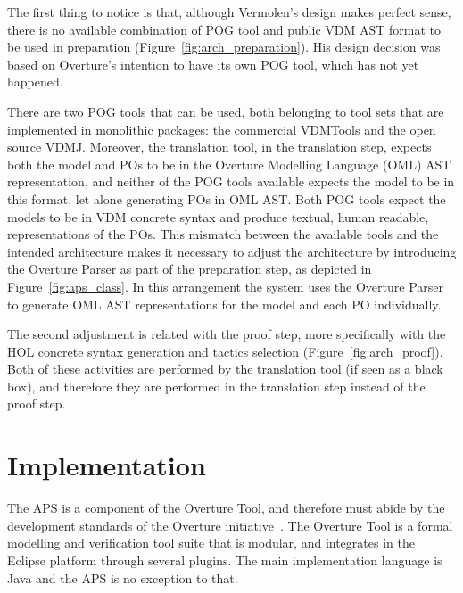 \documentclass[]{article}
\begin{document}
The first thing to notice is that, although Vermolen's design makes perfect sense, there is no available combination of POG tool and public VDM AST format to be used in preparation (Figure~\ref{fig:arch_preparation}).
His design decision was based on Overture's intention to have its own POG tool, which has not yet happened.

There are two POG tools that can be used, both belonging to tool sets that are implemented in monolithic packages: the commercial VDMTools and the open source VDMJ.
Moreover, the translation tool, in the translation step, expects both the model and POs to be in the Overture Modelling Language (OML) AST representation, and neither of the POG tools available expects the model to be in this format, let alone generating POs in OML AST.
Both POG tools expect the models to be in VDM concrete syntax and produce textual, human readable, representations of the POs.
This mismatch between the available tools and the intended architecture makes it necessary to adjust the architecture by introducing the Overture Parser as part of the preparation step, as depicted in Figure~\ref{fig:aps_class}.
In this arrangement the system uses the Overture Parser to generate OML AST representations for the model and each PO individually.

The second adjustment is related with the proof step, more specifically with the HOL concrete syntax generation and tactics selection (Figure~\ref{fig:arch_proof}).
Both of these activities are performed by the translation tool (if seen as a black box), and therefore they are performed in the translation step instead of the proof step.

\section{Implementation}
\label{sec:implementation}

The APS is a component of the Overture Tool, and therefore must abide by the development standards of the Overture initiative~\cite{LarsenBFL08}.
The Overture Tool is a formal modelling and verification tool suite that is modular, and integrates in the Eclipse platform through several plugins.
The main implementation language is Java and the APS is no exception to that.
\end{document}
